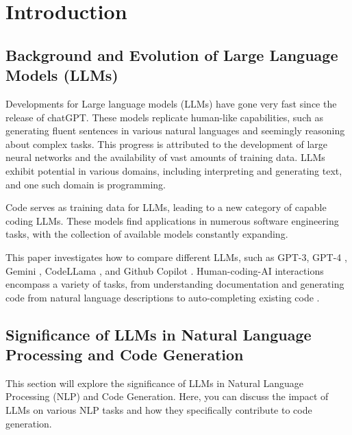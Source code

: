 

\chapter{Introduction}
\label{chap:intro}
\pagestyle{fancy}

\section{Background and Evolution of Large Language Models (LLMs)}

Developments for Large language models (LLMs) have gone very fast since the release of chatGPT. These models replicate human-like capabilities, such as generating fluent sentences in various natural languages and seemingly reasoning about complex tasks. This progress is attributed to the development of large neural networks and the availability of vast amounts of training data. LLMs exhibit potential in various domains, including interpreting and generating text, and one such domain is programming. 

Code serves as training data for LLMs, leading to a new category of capable coding LLMs. These models find applications in numerous software engineering tasks, with the collection of available models constantly expanding. 

This paper investigates how to compare different LLMs, such as GPT-3, GPT-4 \cite{openai2023gpt4}, Gemini \cite{geminiteam2024gemini}, CodeLLama \cite{rozière2024code}, and Github Copilot \cite{dakhel2023github}. Human-coding-AI interactions encompass a variety of tasks, from understanding documentation and generating code from natural language descriptions to auto-completing existing code \cite{fan2023large}.

\section{Significance of LLMs in Natural Language Processing and Code Generation}

This section will explore the significance of LLMs in Natural Language Processing (NLP) and Code Generation. Here, you can discuss the impact of LLMs on various NLP tasks and how they specifically contribute to code generation. 

